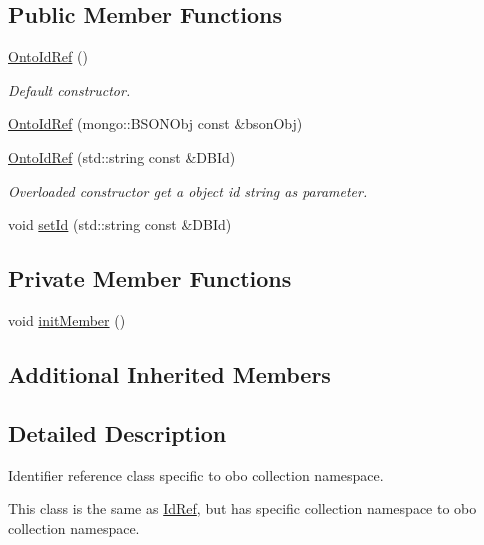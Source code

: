 \subsection*{Public Member Functions}
\begin{DoxyCompactItemize}
\item 
\hyperlink{classunisys_1_1OntoIdRef_ad5cc6e96cc5332819cf9e55e0da9248a}{Onto\-Id\-Ref} ()
\begin{DoxyCompactList}\small\item\em Default constructor. \end{DoxyCompactList}\item 
\hyperlink{classunisys_1_1OntoIdRef_aaca61df90c061176b5c72b73b4eb5823}{Onto\-Id\-Ref} (mongo\-::\-B\-S\-O\-N\-Obj const \&bson\-Obj)
\item 
\hyperlink{classunisys_1_1OntoIdRef_a3bfd2512bf612b0415baeeb6e33bfb4c}{Onto\-Id\-Ref} (std\-::string const \&D\-B\-Id)
\begin{DoxyCompactList}\small\item\em Overloaded constructor get a object id string as parameter. \end{DoxyCompactList}\item 
void \hyperlink{classunisys_1_1OntoIdRef_ada86593a549449a9c66dff8688505db5}{set\-Id} (std\-::string const \&D\-B\-Id)
\end{DoxyCompactItemize}
\subsection*{Private Member Functions}
\begin{DoxyCompactItemize}
\item 
void \hyperlink{classunisys_1_1OntoIdRef_afd6b00a895cf5236e9d202b9060152b8}{init\-Member} ()
\end{DoxyCompactItemize}
\subsection*{Additional Inherited Members}


\subsection{Detailed Description}
Identifier reference class specific to obo collection namespace. 

This class is the same as \hyperlink{classunisys_1_1IdRef}{Id\-Ref}, but has specific collection namespace to obo collection namespace. 

